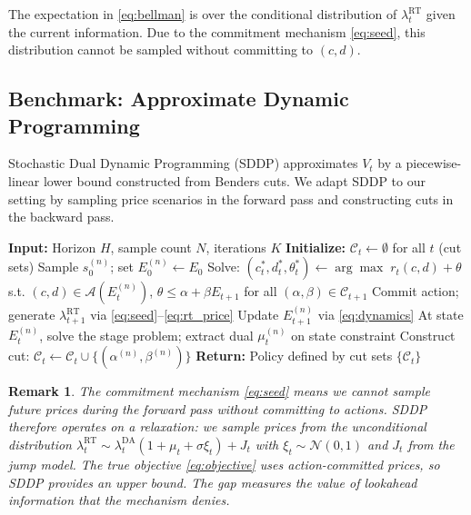 \documentclass[11pt]{article}
\newtheorem{remark}{Remark}
\begin{document}
The expectation in \eqref{eq:bellman} is over the conditional distribution of $\lambda^{\text{RT}}_t$ given the current information. Due to the commitment mechanism \eqref{eq:seed}, this distribution cannot be sampled without committing to $(c,d)$.

\subsection{Benchmark: Approximate Dynamic Programming}

Stochastic Dual Dynamic Programming (SDDP) approximates $V_t$ by a piecewise-linear lower bound constructed from Benders cuts. We adapt SDDP to our setting by sampling price scenarios in the forward pass and constructing cuts in the backward pass.

\begin{algorithm}[H]
\caption{SDDP for Single-Asset Arbitrage}
\begin{algorithmic}[1]
\State \textbf{Input:} Horizon $H$, sample count $N$, iterations $K$
\State \textbf{Initialize:} $\mathcal{C}_t \gets \emptyset$ for all $t$ (cut sets)
     
        \State Sample $s_0^{(n)}$; set $E_0^{(n)} \gets E_0$
            \State Solve: $(c_t^*, d_t^*, \theta_t^*) \gets \arg\max\; r_t(c,d) + \theta$
            \Statex \hspace{4em} s.t. $(c,d) \in \mathcal{A}(E_t^{(n)})$, $\theta \leq \alpha + \beta E_{t+1}$ for all $(\alpha, \beta) \in \mathcal{C}_{t+1}$
            \State Commit action; generate $\lambda^{\text{RT}}_{t+1}$ via \eqref{eq:seed}--\eqref{eq:rt_price}
            \State Update $E_{t+1}^{(n)}$ via \eqref{eq:dynamics}
        \EndFor
    \EndFor
     
            \State At state $E_t^{(n)}$, solve the stage problem; extract dual $\mu^{(n)}_t$ on state constraint
            \State Construct cut: $\mathcal{C}_t \gets \mathcal{C}_t \cup \{(\alpha^{(n)}, \beta^{(n)})\}$
        \EndFor
    \EndFor
\EndFor
\State \textbf{Return:} Policy defined by cut sets $\{\mathcal{C}_t\}$
\end{algorithmic}
\end{algorithm}

\begin{remark}
The commitment mechanism \eqref{eq:seed} means we cannot sample future prices during the forward pass without committing to actions. SDDP therefore operates on a \emph{relaxation}: we sample prices from the unconditional distribution $\lambda^{\text{RT}}_t \sim \lambda^{\text{DA}}_t(1 + \mu_t + \sigma\xi_t) + J_t$ with $\xi_t \sim \mathcal{N}(0,1)$ and $J_t$ from the jump model. The true objective \eqref{eq:objective} uses action-committed prices, so SDDP provides an upper bound. The gap measures the value of lookahead information that the mechanism denies.
\end{remark}
\end{document}
